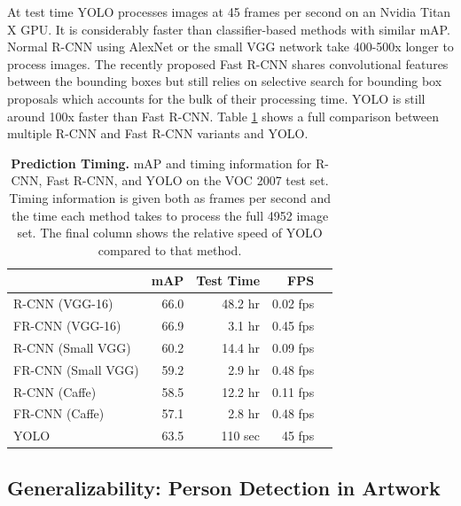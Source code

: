 \documentclass[10pt,twocolumn,letterpaper]{article}
\begin{document}
At test time YOLO processes images at 45 frames per second on an Nvidia Titan X GPU. It is considerably faster than classifier-based methods with similar mAP. Normal R-CNN using AlexNet or the small VGG network take 400-500x longer to process images. The recently proposed Fast R-CNN shares convolutional features between the bounding boxes but still relies on selective search for bounding box proposals which accounts for the bulk of their processing time. YOLO is still around 100x faster than Fast R-CNN. Table \ref{timing} shows a full comparison between multiple R-CNN and Fast R-CNN variants and YOLO.

\begin{table}[h]
\begin{center}
\begin{tabular}{lrrrr}
 & mAP & Test Time & FPS\\
\hline
R-CNN (VGG-16) & 66.0 & 48.2 hr & 0.02 fps \\
FR-CNN (VGG-16) & 66.9 & 3.1 hr & 0.45 fps \\
R-CNN (Small VGG) & 60.2 & 14.4 hr & 0.09 fps \\
FR-CNN (Small VGG) & 59.2 & 2.9 hr & 0.48 fps \\
R-CNN (Caffe) & 58.5 & 12.2 hr & 0.11 fps \\
FR-CNN (Caffe) & 57.1 & 2.8 hr & 0.48 fps \\
YOLO & 63.5 & 110 sec & 45 fps \\
\end{tabular}
\end{center}
\caption{\small \textbf{Prediction Timing.} mAP and timing information for R-CNN, Fast R-CNN, and YOLO on the VOC 2007 test set. Timing information is given both as frames per second and the time each method takes to process the full 4952 image set. The final column shows the relative speed of YOLO compared to that method.}
\label{timing}
\end{table}
\fi

\subsection{Generalizability: Person Detection in Artwork}
\end{document}
